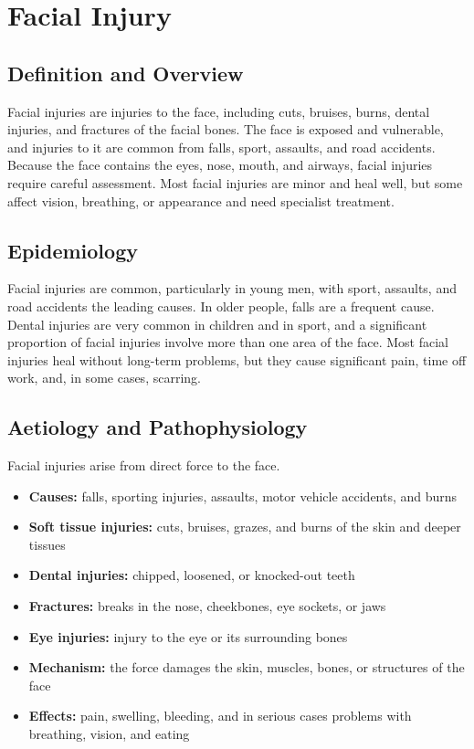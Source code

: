 \chapter{Facial Injury}

\section*{Definition and Overview}
Facial injuries are injuries to the face, including cuts, bruises, burns, dental injuries, and fractures of the facial bones. The face is exposed and vulnerable, and injuries to it are common from falls, sport, assaults, and road accidents. Because the face contains the eyes, nose, mouth, and airways, facial injuries require careful assessment. Most facial injuries are minor and heal well, but some affect vision, breathing, or appearance and need specialist treatment.

\section*{Epidemiology}
Facial injuries are common, particularly in young men, with sport, assaults, and road accidents the leading causes. In older people, falls are a frequent cause. Dental injuries are very common in children and in sport, and a significant proportion of facial injuries involve more than one area of the face. Most facial injuries heal without long-term problems, but they cause significant pain, time off work, and, in some cases, scarring.

\section*{Aetiology and Pathophysiology}
Facial injuries arise from direct force to the face.
\begin{itemize}
    \item \textbf{Causes:} falls, sporting injuries, assaults, motor vehicle accidents, and burns
    \item \textbf{Soft tissue injuries:} cuts, bruises, grazes, and burns of the skin and deeper tissues
    \item \textbf{Dental injuries:} chipped, loosened, or knocked-out teeth
    \item \textbf{Fractures:} breaks in the nose, cheekbones, eye sockets, or jaws
    \item \textbf{Eye injuries:} injury to the eye or its surrounding bones
    \item \textbf{Mechanism:} the force damages the skin, muscles, bones, or structures of the face
    \item \textbf{Effects:} pain, swelling, bleeding, and in serious cases problems with breathing, vision, and eating
\end{itemize}

